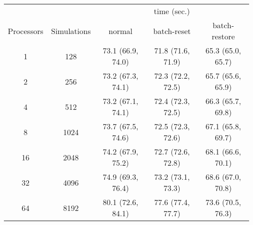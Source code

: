 \begin{tabular}{ccccc}
\toprule
& & \multicolumn{3}{c}{time (sec.)} \\
\cmidrule{3-5}
Processors & Simulations & normal & batch-reset & batch-restore \\
\midrule
1 & 128 & 73.1 (66.9, 74.0) & 71.8 (71.6, 71.9) & 65.3 (65.0, 65.7) \\
2 & 256 & 73.2 (67.3, 74.1) & 72.3 (72.2, 72.5) & 65.7 (65.6, 65.9) \\
4 & 512 & 73.2 (67.1, 74.1) & 72.4 (72.3, 72.5) & 66.3 (65.7, 69.8) \\
8 & 1024 & 73.7 (67.5, 74.6) & 72.5 (72.3, 72.6) & 67.1 (65.8, 69.7) \\
16 & 2048 & 74.2 (67.9, 75.2) & 72.7 (72.6, 72.8) & 68.1 (66.6, 70.1) \\
32 & 4096 & 74.9 (69.3, 76.4) & 73.2 (73.1, 73.3) & 68.6 (67.0, 70.8) \\
64 & 8192 & 80.1 (72.6, 84.1) & 77.6 (77.4, 77.7) & 73.6 (70.5, 76.3) \\
\bottomrule
\end{tabular}